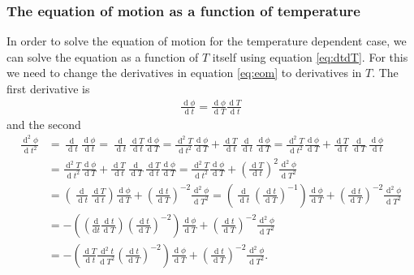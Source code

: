 \documentclass[a4paper]{article}
\DeclareMathOperator*{\diff}{d}
\begin{document}
\subsubsection{The equation of motion as a function of temperature}
In order to solve the equation of motion for the temperature dependent
case, we can solve the equation as a function of $T$ itself using equation \ref{eq:dtdT}. For this we need to change the derivatives
in equation \ref{eq:eom} to derivatives in $T$.
The first derivative is
\begin{align*}
    \frac{\diff  \phi}{\diff  t} = \frac{\diff  \phi}{\diff  T} \frac{\diff  T}{\diff  t}
\end{align*}
and the second 
\begin{align*}
    \frac{\diff ^2 \phi}{\diff  t^2} &= \frac{\diff }{\diff  t} \frac{\diff  \phi}{\diff  t}
    = \frac{\diff }{\diff  t} \frac{\diff  T}{\diff  t} \frac{\diff  \phi}{\diff  T}
    = \frac{\diff ^2 T}{\diff  t^2} \frac{\diff  \phi}{\diff  T} +
      \frac{\diff  T}{\diff  t} \frac{\diff }{\diff  t} \frac{\diff  \phi}{\diff  T}
    = \frac{\diff ^2 T}{\diff  t^2} \frac{\diff  \phi}{\diff  T} +
      \frac{\diff  T}{\diff  t} \frac{\diff }{\diff  T} \frac{\diff  \phi}{\diff  t} \\
    &= \frac{\diff ^2 T}{\diff  t^2} \frac{\diff  \phi}{\diff  T} +
      \frac{\diff  T}{\diff  t} \frac{\diff }{\diff  T} \frac{\diff  T}{\diff  t} \frac{\diff  \phi}{\diff  T}
    = \frac{\diff ^2 T}{\diff  t^2} \frac{\diff  \phi}{\diff  T} +
      \left( \frac{\diff  T}{\diff  t} \right)^2 \frac{\diff^2  \phi}{\diff  T^2} \\
    &= \left( \frac{\diff}{\diff t} \frac{\diff T}{\diff t} \right) \frac{\diff  \phi}{\diff  T} +
      \left( \frac{\diff  t}{\diff  T} \right)^{-2} \frac{\diff^2  \phi}{\diff  T^2}
    = \left( \frac{\diff}{\diff t} \left( \frac{\diff t}{\diff T} \right)^{-1} \right) \frac{\diff  \phi}{\diff  T} +
      \left( \frac{\diff  t}{\diff  T} \right)^{-2} \frac{\diff^2  \phi}{\diff  T^2} \\
    &= - \left(\left( \frac{\mathrm{d}}{\mathrm{d} t} \frac{\diff t}{\diff T} \right)  \left( \frac{\diff t}{\diff T} \right)^{-2} \right) \frac{\diff  \phi}{\diff  T} +
      \left( \frac{\diff  t}{\diff  T} \right)^{-2} \frac{\diff^2  \phi}{\diff  T^2} \\
    &= - \left(\frac{\diff T}{\diff t} \frac{\diff^2 t}{\diff T^2} \left( \frac{\diff t}{\diff T} \right)^{-2} \right) \frac{\diff  \phi}{\diff  T} +
      \left( \frac{\diff  t}{\diff  T} \right)^{-2} \frac{\diff^2  \phi}{\diff  T^2}.
\end{align*}
\end{document}
